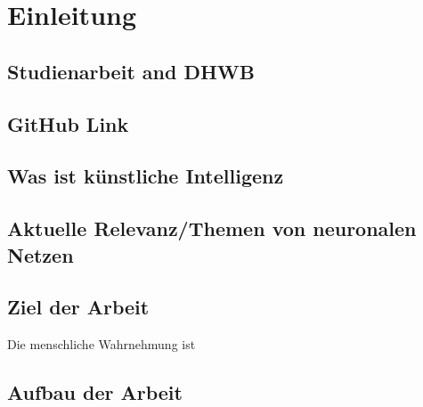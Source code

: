 \chapter{Einleitung}

\section{Studienarbeit and DHWB}

\section{GitHub Link}

\section{Was ist künstliche Intelligenz}

\section{Aktuelle Relevanz/Themen von neuronalen Netzen}

\section{Ziel der Arbeit}
Die menschliche Wahrnehmung ist 

\section{Aufbau der Arbeit}